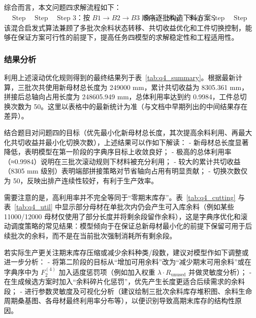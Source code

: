 \documentclass[UTF8]{ctexart}
\begin{document}
综合而言，本文问题四求解流程如下：
\[
\begin{aligned}
&\text{Step 1：读取三批次需求、工件长度和共切收益矩阵；}\
&\text{Step 2：初始化余料库存为空，并设置字典序评价准则；}\
&\text{Step 3：按 }B1\rightarrow B2\rightarrow B3\text{ 顺序逐批构造下料方案；}\
&\text{Step 4：每批优先调用库存余料，不足时补充新标准母材；}\
&\text{Step 5：对材料内部加工序列执行交换、翻转和朝向调整；}\
&\text{Step 6：根据剩余长度更新下一批余料库存；}\
&\text{Step 7：进行需求、容量、余料流向和局部共切约束校验；}\
&\text{Step 8：重复多轮随机搜索，输出字典序目标最优的可行方案。}
\end{aligned}
\]
该混合启发式算法兼顾了多批次余料状态转移、共切收益优化和工件切换控制，能够在保证方案可行性的前提下，提高任务四模型的求解稳定性和工程适用性。

\subsubsection{结果分析}

利用上述滚动优化规则得到的最终结果列于表~\ref{tab:q4_summary}。根据最新计算，三批次共使用新母材总长度为 249000 mm，累计共切收益为 8305.361 mm，拼接后总轴向占用长度为 248605.949 mm，总体利用率达到约 0.9984，工件总切换次数为 50。这里以表格中的最新统计为准（与文档中早期列出的中间结果存在差异）。

结合题目对问题四的目标（优先最小化新母材总长度，其次提高余料利用、再最大化共切收益并最小化切换次数），上述结果可以作如下解读：
 - 新母材总长度显著降低，表明模型在第一阶段的字典序目标上收敛良好；
 - 极高的总体利用率（≈0.9984）说明在三批次滚动规则下材料被充分利用；
 - 较大的累计共切收益（8305 mm 级别）表明端部拼接策略对节省轴向占用有明显贡献；
 - 切换次数仅为 50，反映出排产连续性较好，有利于生产效率。

需要注意的是，高利用率并不完全等同于“零期末库存”。表~\ref{tab:q4_cutting} 与表~\ref{tab:q4_util} 中显示部分母材在单批次内仍会产生可入库余料（例如某些 11000/12000 母材仅使用了部分长度并将剩余段留作余料），这是字典序优化和滚动调度策略的常见结果：模型倾向于在保证总新母材最小化的前提下保留可用于后续批次的余料，而不是在当前批次强制消耗所有剩余段。

若实际生产更关注期末库存压缩或减少余料种类/段数，建议对模型作如下调整或进一步分析：
 - 将第二阶段的目标从“增加可用余料”改为“减少期末可用余料”或在字典序中为 $F_2^{(4)}$ 加入适度惩罚项（例如加入权重 $\lambda\cdot R_{\mathrm{unused}}$ 并做灵敏度分析）；
 - 在生成候选方案时加入“余料碎片化惩罚”，优先产生长度更适合后续需求的余料段；
 - 进行参数灵敏度及可视化分析（建议绘制三批次余料库存堆积图、余料生命周期桑基图、各母材最终利用率分布等），以便识别导致高期末库存的结构性原因。
\end{document}
